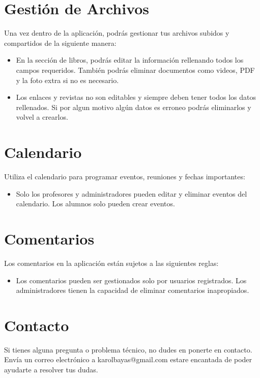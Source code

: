 \documentclass[a4paper, 12pt]{book}
\begin{document}
\section{Gestión de Archivos}

Una vez dentro de la aplicación, podrás gestionar tus archivos subidos y compartidos de la siguiente manera:

\begin{itemize}
    \item En la sección de libros, podrás editar la información rellenando todos los campos requeridos. También podrás eliminar 
    documentos como videos, PDF y la foto extra si no es necesario.
    \item Los enlaces y revistas no son editables y siempre deben tener todos los datos rellenados. Si por algun motivo algún datos es 
    erroneo podrás eliminarlos y volvel a crearlos.
\end{itemize}

\section{Calendario}

Utiliza el calendario para programar eventos, reuniones y fechas importantes:

\begin{itemize}
    \item Solo los profesores y administradores pueden editar y eliminar eventos del calendario. Los alumnos solo pueden crear eventos.
\end{itemize}

\section{Comentarios}

Los comentarios en la aplicación están sujetos a las siguientes reglas:

\begin{itemize}
    \item Los comentarios pueden ser gestionados solo por usuarios registrados. Los administradores tienen la capacidad de eliminar comentarios inapropiados.
\end{itemize}

\section{Contacto}

Si tienes alguna pregunta o problema técnico, no dudes en ponerte en contacto. Envía un correo electrónico a karolbayas@gmail.com 
estare encantada de poder ayudarte a resolver tus dudas.
\end{document}
